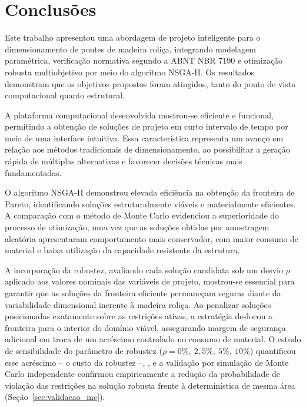 \section{Conclusões}\label{sec:conclusoes}

Este trabalho apresentou uma abordagem de projeto inteligente para o dimensionamento de pontes de madeira roliça, integrando modelagem paramétrica, verificação normativa segundo a ABNT NBR 7190 e otimização robusta multiobjetivo por meio do algoritmo NSGA-II. Os resultados demonstram que os objetivos propostos foram atingidos, tanto do ponto de vista computacional quanto estrutural.

A plataforma computacional desenvolvida mostrou-se eficiente e funcional, permitindo a obtenção de soluções de projeto em curto intervalo de tempo por meio de uma interface intuitiva. Essa característica representa um avanço em relação aos métodos tradicionais de dimensionamento, ao possibilitar a geração rápida de múltiplas alternativas e favorecer decisões técnicas mais fundamentadas.

O algoritmo NSGA-II demonstrou elevada eficiência na obtenção da fronteira de Pareto, identificando soluções estruturalmente viáveis e materialmente eficientes. A comparação com o método de Monte Carlo evidenciou a superioridade do processo de otimização, uma vez que as soluções obtidas por amostragem aleatória apresentaram comportamento mais conservador, com maior consumo de material e baixa utilização da capacidade resistente da estrutura.

A incorporação da robustez, avaliando cada solução candidata sob um desvio $\rho$ aplicado aos valores nominais das variáveis de projeto, mostrou-se essencial para garantir que as soluções da fronteira eficiente permaneçam seguras diante da variabilidade dimensional inerente à madeira roliça. Ao penalizar soluções posicionadas exatamente sobre as restrições ativas, a estratégia deslocou a fronteira para o interior do domínio viável, assegurando margem de segurança adicional em troca de um acréscimo controlado no consumo de material. O estudo de sensibilidade do parâmetro de robustez ($\rho = 0\%,\ 2{,}5\%,\ 5\%,\ 10\%$) quantificou esse acréscimo -- o custo da robustez --, , e a validação por simulação de Monte Carlo independente confirmou empiricamente a redução da probabilidade de violação das restrições na solução robusta frente à determinística de mesma área (Seção~\ref{sec:validacao_mc}).

